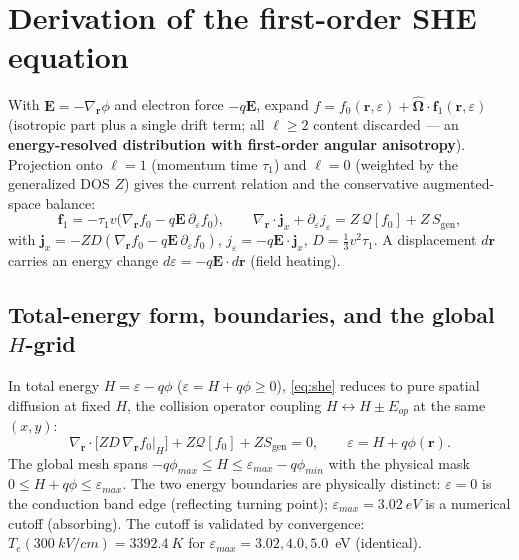 \documentclass[11pt]{article}
\newcommand{\eps}{\varepsilon}
\newcommand{\vecr}{\mathbf{r}}
\newcommand{\vecE}{\mathbf{E}}
\newcommand{\vecj}{\mathbf{j}}
\newcommand{\Om}{\hat{\boldsymbol{\Omega}}}
\newcommand{\gradr}{\nabla_{\!\vecr}}
\begin{document}
\section{Derivation of the first-order SHE equation}\label{sec:derivation}
With $\vecE=-\gradr\phi$ and electron force $-q\vecE$, expand $f=f_0(\vecr,\eps)+\Om\cdot
\mathbf{f}_1(\vecr,\eps)$ (isotropic part plus a single drift term; all $\ell\ge2$ content
discarded --- an \textbf{energy-resolved distribution with first-order angular anisotropy}).
Projection onto $\ell=1$ (momentum time $\tau_1$) and $\ell=0$ (weighted by the generalized
DOS $Z$) gives the current relation and the conservative augmented-space balance:
\begin{equation}
\mathbf{f}_1=-\tau_1 v\big(\gradr f_0-q\vecE\,\partial_\eps f_0\big),\qquad
\gradr\!\cdot\vecj_x+\partial_\eps j_\eps= Z\,\mathcal{Q}[f_0]+Z\,S_{\text{gen}},
\label{eq:she}
\end{equation}
with $\vecj_x=-ZD(\gradr f_0-q\vecE\,\partial_\eps f_0)$, $j_\eps=-q\vecE\!\cdot\vecj_x$,
$D=\tfrac13 v^2\tau_1$. A displacement $d\vecr$ carries an energy change
$d\eps=-q\vecE\!\cdot d\vecr$ (field heating).

\subsection{Total-energy form, boundaries, and the global \texorpdfstring{$H$}{H}-grid}
In total energy $H=\eps-q\phi$ ($\eps=H+q\phi\ge0$), \eqref{eq:she} reduces to pure spatial
diffusion at fixed $H$, the collision operator coupling $H\!\leftrightarrow\!H\pm E_{op}$ at
the same $(x,y)$:
\begin{equation}
\gradr\!\cdot\!\big[ZD\,\gradr f_0|_H\big]+Z\mathcal{Q}[f_0]+ZS_{\text{gen}}=0,\qquad
\eps=H+q\phi(\vecr).
\label{eq:sheH}
\end{equation}
The global mesh spans $-q\phi_{max}\le H\le\eps_{max}-q\phi_{min}$ with the physical mask
$0\le H+q\phi\le\eps_{max}$. The two energy boundaries are physically distinct:
$\eps=0$ is the conduction band edge (reflecting turning point); $\eps_{max}=\SI{3.02}{eV}$
is a numerical cutoff (absorbing). The cutoff is validated by convergence:
$T_e(\SI{300}{kV/cm})=\SI{3392.4}{K}$ for $\eps_{max}=3.02,4.0,5.0$~eV (identical).
\end{document}
